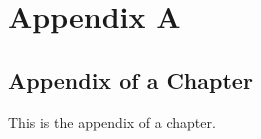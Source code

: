 \renewcommand{\publicationhead}{}

\chapter*{Appendix A}\label{app:A}
\renewcommand{\thesection}{A.\arabic{section}}
\renewcommand{\thetable}{A.\arabic{table}}

\section{Appendix of a Chapter}

This is the appendix of a chapter.
